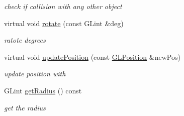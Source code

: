 \begin{DoxyCompactItemize}
\begin{DoxyCompactList}\small\item\em check if collision with any other object \end{DoxyCompactList}\item 
\hypertarget{classCircularObstacle_a6a795a94b3df599203bd94f7098a0c65}{virtual void \hyperlink{classCircularObstacle_a6a795a94b3df599203bd94f7098a0c65}{rotate} (const G\-Lint \&deg)}\label{classCircularObstacle_a6a795a94b3df599203bd94f7098a0c65}

\begin{DoxyCompactList}\small\item\em ratote  degrees \end{DoxyCompactList}\item 
\hypertarget{classCircularObstacle_a888250b42230e2b6f5711428d3f20854}{virtual void \hyperlink{classCircularObstacle_a888250b42230e2b6f5711428d3f20854}{update\-Position} (const \hyperlink{structGLPosition}{G\-L\-Position} \&new\-Pos)}\label{classCircularObstacle_a888250b42230e2b6f5711428d3f20854}

\begin{DoxyCompactList}\small\item\em update position with  \end{DoxyCompactList}\item 
\hypertarget{classCircularObstacle_a4389dbe384efd2055adfbf2bfd8c8683}{G\-Lint \hyperlink{classCircularObstacle_a4389dbe384efd2055adfbf2bfd8c8683}{get\-Radius} () const }\label{classCircularObstacle_a4389dbe384efd2055adfbf2bfd8c8683}

\begin{DoxyCompactList}\small\item\em get the radius \end{DoxyCompactList}\end{DoxyCompactItemize}
